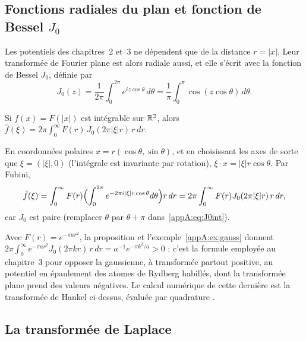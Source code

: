 \subsection{Fonctions radiales du plan et fonction de Bessel \texorpdfstring{$J_0$}{J0}}\label{appA:ssec:hankel}

Les potentiels des chapitres~2 et~3 ne dépendent que de la distance $r=|x|$. Leur transformée de Fourier plane est
alors radiale aussi, et elle s'écrit avec la fonction de Bessel $J_0$, définie par
\begin{equation}\label{appA:eq:J0int}
J_0(z)=\frac1{2\pi}\int_0^{2\pi}e^{iz\cos\theta}\,d\theta=\frac1\pi\int_0^\pi\cos(z\cos\theta)\,d\theta .
\end{equation}

\begin{proposition}\label{appA:prop:hankel}
Si $f(x)=F(|x|)$ est intégrable sur $\mathbb{R}^2$, alors $\hat f(\xi)=2\pi\int_0^\infty F(r)\,J_0(2\pi|\xi|r)\,r\,dr$.
\end{proposition}

\begin{humanproof}
En coordonnées polaires $x=r(\cos\theta,\sin\theta)$, et en choisissant les axes de sorte que
$\xi=(|\xi|,0)$ (l'intégrale est invariante par rotation), $\xi\cdot x=|\xi|r\cos\theta$. Par Fubini,
\[\hat f(\xi)=\int_0^\infty F(r)\Bigl(\int_0^{2\pi}e^{-2\pi i|\xi|r\cos\theta}d\theta\Bigr)r\,dr
=2\pi\int_0^\infty F(r)J_0(2\pi|\xi|r)\,r\,dr ,\]
car $J_0$ est paire (remplacer $\theta$ par $\theta+\pi$ dans~\eqref{appA:eq:J0int}).
\end{humanproof}

\begin{remark}
Avec $F(r)=e^{-\pi ar^2}$, la proposition et l'exemple~\ref{appA:ex:gauss} donnent
$2\pi\int_0^\infty e^{-\pi ar^2}J_0(2\pi kr)\,r\,dr=a^{-1}e^{-\pi k^2/a}>0$ : c'est la formule employée au
chapitre~3 pour opposer la gaussienne, à transformée partout positive, au potentiel en épaulement des atomes de Rydberg
habillés, dont la transformée plane prend des valeurs négatives. Le calcul numérique de cette dernière est la
transformée de Hankel ci-dessus, évaluée par quadrature \tierX.
\end{remark}

\subsection{La transformée de Laplace}

